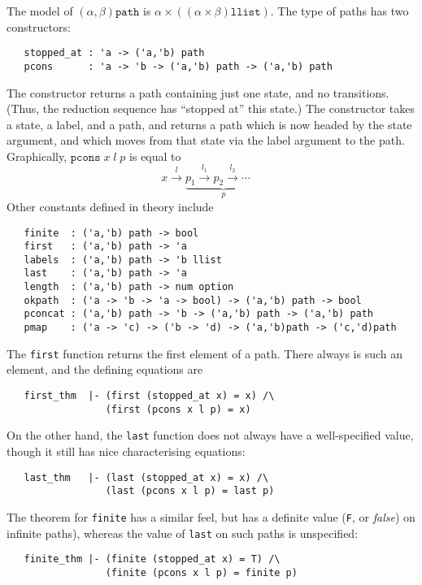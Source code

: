 The model of $(\alpha,\beta)\texttt{path}$ is $\alpha \times
((\alpha\times\beta)\texttt{llist})$.  The type of paths has two
constructors:
{\small
\begin{verbatim}
   stopped_at : 'a -> ('a,'b) path
   pcons      : 'a -> 'b -> ('a,'b) path -> ('a,'b) path
\end{verbatim}
}
The  constructor returns a path containing just one
state, and no transitions.  (Thus, the reduction sequence has
``stopped at'' this state.)  The  constructor takes a state,
a label, and a path, and returns a path which is now headed by the
state argument, and which moves from that state via the label argument
to the path.  Graphically, $\texttt{pcons}\;x\;l\;p$ is equal to
\[
x \stackrel{l}{\longrightarrow}
\underbrace{p_1 \stackrel{l_1}{\longrightarrow} p_2
  \stackrel{l_2}{\longrightarrow} \cdots\quad}_p
\]
Other constants defined in theory  include
{\small
\begin{verbatim}
   finite  : ('a,'b) path -> bool
   first   : ('a,'b) path -> 'a
   labels  : ('a,'b) path -> 'b llist
   last    : ('a,'b) path -> 'a
   length  : ('a,'b) path -> num option
   okpath  : ('a -> 'b -> 'a -> bool) -> ('a,'b) path -> bool
   pconcat : ('a,'b) path -> 'b -> ('a,'b) path -> ('a,'b) path
   pmap    : ('a -> 'c) -> ('b -> 'd) -> ('a,'b)path -> ('c,'d)path
\end{verbatim}
}

The \texttt{first} function returns the first element of a path.
There always is such an element, and the defining equations are
{\small
\begin{verbatim}
   first_thm  |- (first (stopped_at x) = x) /\
                 (first (pcons x l p) = x)
\end{verbatim}
}

On the other hand, the \texttt{last} function does not always have a
well-specified value, though it still has nice characterising
equations:
{\small
\begin{verbatim}
   last_thm   |- (last (stopped_at x) = x) /\
                 (last (pcons x l p) = last p)
\end{verbatim}
}

The theorem for \texttt{finite} has a similar feel, but has a definite
value (\texttt{F}, or \emph{false}) on infinite paths), whereas the
value of \texttt{last} on such paths is unspecified:
{\small
\begin{verbatim}
   finite_thm |- (finite (stopped_at x) = T) /\
                 (finite (pcons x l p) = finite p)
\end{verbatim}
}

